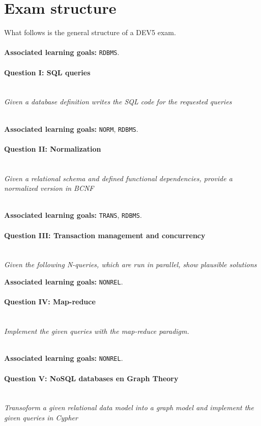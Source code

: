 \section*{Exam structure}
What follows is the general structure of a DEV5 exam.
\\ 
\\
\textbf{Associated learning goals:} \texttt{RDBMS}.
\paragraph{Question I: SQL queries} \ \\

\textit{Given a database definition writes the SQL code for the requested queries} 


\ \\ 
\textbf{Associated learning goals:} \texttt{NORM}, \texttt{RDBMS}.
\paragraph{Question II: Normalization} \ \\ 

\textit{Given a relational schema and defined functional dependencies, provide a normalized version in BCNF}

\ \\ 

\textbf{Associated learning goals:} \texttt{TRANS}, \texttt{RDBMS}.
\paragraph{Question III: Transaction management and concurrency}

\ \\ 

\textit{Given the following N-queries, which are run in parallel, show plausible solutions }


\textbf{Associated learning goals:} \texttt{NONREL}.
\paragraph{Question IV: Map-reduce}

\ \\ 

\textit{Implement the given queries with the map-reduce paradigm.}

\ \\ 
\textbf{Associated learning goals:} \texttt{NONREL}.
\paragraph{Question V: NoSQL databases en Graph Theory}

\ \\ 

\textit{Transoform a given relational data model into a graph model and implement the given queries in Cypher}